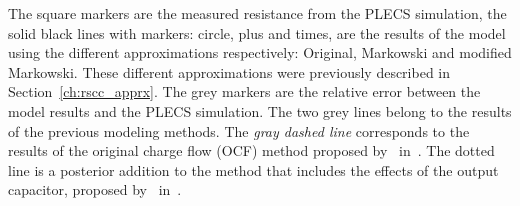 The square markers are the measured resistance from the PLECS simulation, the solid black lines with markers: circle, plus and times, are the results of the model using the different approximations respectively: Original, Markowski and modified Markowski. These different approximations were previously described in Section~\ref{ch:rscc_apprx}. The grey markers are the relative error between the model results and the PLECS simulation.  The two grey lines belong to the results of the previous modeling methods. The \emph{gray dashed line}  corresponds to the results of the original charge flow (OCF) method proposed  by~\citeauthor{95Makowski} in~\citeyear{95Makowski}. The dotted line is a posterior addition to the method that includes the effects of the output capacitor, proposed by~\citeauthor{2013Breussegem:c_out} in~\cite{2013Breussegem:c_out}.


